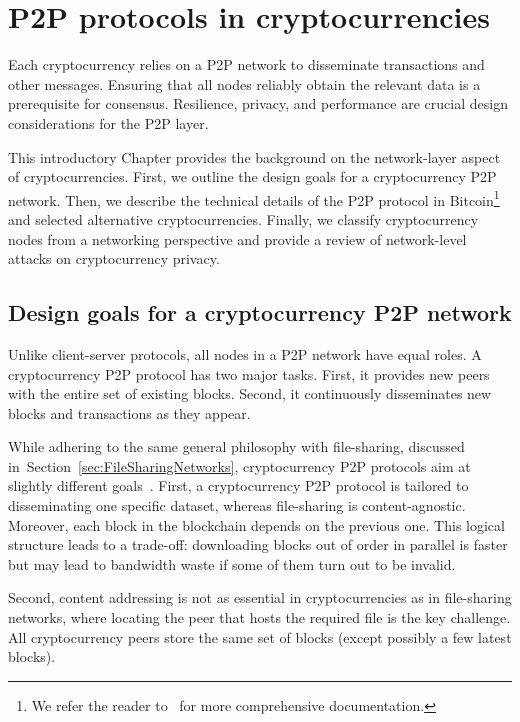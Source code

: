 \chapter{P2P protocols in cryptocurrencies}

\label{Chapter02IntroP2P}

Each cryptocurrency relies on a P2P network to disseminate transactions and other messages.
Ensuring that all nodes reliably obtain the relevant data is a prerequisite for consensus.
Resilience, privacy, and performance are crucial design considerations for the P2P layer.

This introductory Chapter provides the background on the network-layer aspect of cryptocurrencies.
First, we outline the design goals for a cryptocurrency P2P network.
Then, we describe the technical details of the P2P protocol in Bitcoin\footnote{We refer the reader to~\cite{BitcoinWiki, Garay2015} for more comprehensive documentation.} and selected alternative cryptocurrencies.
Finally, we classify cryptocurrency nodes from a networking perspective and provide a review of network-level attacks on cryptocurrency privacy.


\section{Design goals for a cryptocurrency P2P network}

Unlike client-server protocols, all nodes in a P2P network have equal roles.
A cryptocurrency P2P protocol has two major tasks.
First, it provides new peers with the entire set of existing blocks.
Second, it continuously disseminates new blocks and transactions as they appear.

While adhering to the same general philosophy with file-sharing, discussed in~Section~\ref{sec:FileSharingNetworks}, cryptocurrency P2P protocols aim at slightly different goals~\cite{Dotan2020}.
First, a cryptocurrency P2P protocol is tailored to disseminating one specific dataset, whereas file-sharing is content-agnostic.
Moreover, each block in the blockchain depends on the previous one.
This logical structure leads to a trade-off: downloading blocks out of order in parallel is faster but may lead to bandwidth waste if some of them turn out to be invalid.

Second, content addressing is not as essential in cryptocurrencies as in file-sharing networks, where locating the peer that hosts the required file is the key challenge.
All cryptocurrency peers store the same set of blocks (except possibly a few latest blocks).

